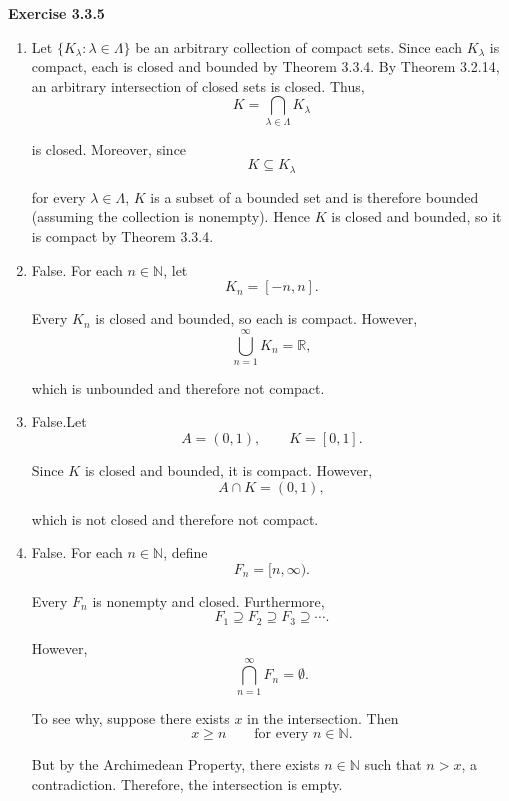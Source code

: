 \documentclass[12pt]{article}
\begin{document}
\textbf{Exercise 3.3.5}
\begin{enumerate}[label=(\alph*)]
    \item Let \(\{K_\lambda:\lambda\in\Lambda\}\) be an arbitrary collection of compact sets.
          Since each \(K_\lambda\) is compact, each is closed and bounded by Theorem 3.3.4.
          By Theorem 3.2.14, an arbitrary intersection of closed sets is closed. Thus,
          \[
              K=\bigcap_{\lambda\in\Lambda}K_\lambda
          \]

          is closed.
          Moreover, since
          \[
              K\subseteq K_\lambda
          \]

          for every \(\lambda\in\Lambda\), \(K\) is a subset of a bounded set and is therefore bounded (assuming the collection is nonempty).
          Hence \(K\) is closed and bounded, so it is compact by Theorem 3.3.4.

    \item False. For each \(n\in\mathbb N\), let
          \[
              K_n=[-n,n].
          \]

          Every \(K_n\) is closed and bounded, so each is compact.
          However,
          \[
              \bigcup_{n=1}^{\infty}K_n=\mathbb R,
          \]

          which is unbounded and therefore not compact.


    \item False.Let
          \[
              A=(0,1),\qquad K=[0,1].
          \]

          Since \(K\) is closed and bounded, it is compact.
          However,
          \[
              A\cap K=(0,1),
          \]

          which is not closed and therefore not compact.

    \item False. For each \(n\in\mathbb N\), define
          \[
              F_n=[n,\infty).
          \]

          Every \(F_n\) is nonempty and closed. Furthermore,
          \[
              F_1\supseteq F_2\supseteq F_3\supseteq\cdots.
          \]

          However,
          \[
              \bigcap_{n=1}^{\infty}F_n=\emptyset.
          \]

          To see why, suppose there exists \(x\) in the intersection. Then
          \[
              x\ge n\qquad\text{for every }n\in\mathbb N.
          \]

          But by the Archimedean Property, there exists \(n\in\mathbb N\) such that \(n>x\), a contradiction.
          Therefore, the intersection is empty.
\end{enumerate}
\end{document}
